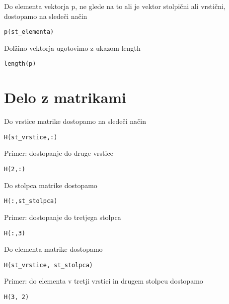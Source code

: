 Do elementa vektorja p, ne glede na to ali je vektor stolpični ali vrstični, dostopamo na sledeči način
\vspace{-0.5cm}
\begin{lstlisting}
p(st_elementa)
\end{lstlisting}
\vspace{0.2cm}

Dolžino vektorja ugotovimo z ukazom length
\vspace{-0.5cm}
\begin{lstlisting}
length(p)
\end{lstlisting}
\vspace{0.2cm}

\section{Delo z matrikami}
Do vrstice matrike dostopamo na sledeči način
\vspace{-0.5cm}
\begin{lstlisting}
H(st_vrstice,:)
\end{lstlisting}
\vspace{0.2cm}

Primer: dostopanje do druge vrstice

\vspace{-0.5cm}
\begin{lstlisting}
H(2,:)
\end{lstlisting}
\vspace{0.2cm}


Do stolpca matrike dostopamo
\vspace{-0.5cm}
\begin{lstlisting}
H(:,st_stolpca)
\end{lstlisting}
\vspace{0.2cm}

Primer: dostopanje do tretjega stolpca
\vspace{-0.5cm}
\begin{lstlisting}
H(:,3)
\end{lstlisting}
\vspace{0.2cm}

Do elementa matrike dostopamo
\vspace{-0.5cm}
\begin{lstlisting}
H(st_vrstice, st_stolpca)
\end{lstlisting}
\vspace{0.2cm}

Primer: do elementa v tretji vrstici in drugem stolpcu dostopamo
\vspace{-0.5cm}
\begin{lstlisting}
H(3, 2)
\end{lstlisting}
\vspace{0.2cm}

